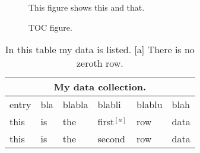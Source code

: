 \documentclass{article}
\begin{document}


%
%



\newpage

\begin{figure}
\caption{This figure shows this and that.}
\label{fig1}
\end{figure}

\begin{figure}
\caption{TOC figure.}
\label{TOCfig}
\end{figure}

\begin{table}
\begin{center}
\begin{tabular}{l l l l l l}
\hline
\multicolumn{6}{c}{My data collection.}\\
\hline
entry & bla & blabla & blabli & blablu & blah\\
\hline
this & is & the & first$^{[a]}$ & row & data \\
this & is & the & second & row & data \\
\hline
\end{tabular}
\end{center}
\caption{In this table my data is listed. [a] There is no zeroth row. }
\label{tab1}
\end{table}
\end{document}
